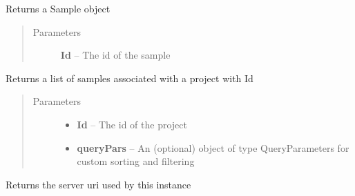 \documentclass[letterpaper,10pt,english]{sphinxmanual}
\begin{document}
\begin{fulllineitems}
\begin{fulllineitems}
\end{fulllineitems}


\begin{fulllineitems}
\label{Available modules:BaseSpacePy.api.BaseSpaceAPI.BaseSpaceAPI.getSampleById}
Returns a Sample object
\begin{quote}\begin{description}
\item[{Parameters}] \leavevmode
\textbf{Id} -- The id of the sample

\end{description}\end{quote}

\end{fulllineitems}


\begin{fulllineitems}
\label{Available modules:BaseSpacePy.api.BaseSpaceAPI.BaseSpaceAPI.getSamplesByProject}
Returns a list of samples associated with a project with Id
\begin{quote}\begin{description}
\item[{Parameters}] \leavevmode\begin{itemize}
\item {} 
\textbf{Id} -- The id of the project

\item {} 
\textbf{queryPars} -- An (optional) object of type QueryParameters for custom sorting and filtering

\end{itemize}

\end{description}\end{quote}

\end{fulllineitems}


\begin{fulllineitems}
\label{Available modules:BaseSpacePy.api.BaseSpaceAPI.BaseSpaceAPI.getServerUri}
Returns the server uri used by this instance


\end{fulllineitems}
\end{fulllineitems}
\end{document}
